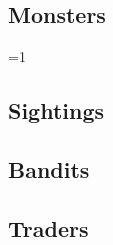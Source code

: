 \documentclass[a4paper,openany]{book}
\begin{document}
\begin{multicols}{2}

\ifcase\value{temperature}\relax%
\or
  \encColdVillages
  \encColdEdge
  \encColdForest
\or
  \encMildVillages
  \encMildEdge
  \encMildForest
\or
  \encWarmVillages
  \encWarmEdge
  \encWarmForest
\else
  \encMildVillages
  \encMildEdge
  \encMildForest
\fi

\subsection*{Monsters}

\setcounter{enc}{\value{temperature}}
\ifnum\value{temperature}=1
\fi

\begin{dlist}
\end{dlist}

\subsection*{Sightings}

\setcounter{track}{\value{temperature}}
\begin{dlist}
\end{dlist}

\subsection*{Bandits}

\encBandits

\subsection*{Traders}

\encTraders

\end{multicols}

\iftoggle{core}{
  \newpage
  \stackingDamageChart

  \begin{multicols}{2}

  \textbf{Mana Regeneration}

  \noindent
  \manaRegenChart

  \noindent
  \manaCoveringChart

  \larcenyChart
  \initiativechart

  \end{multicols}

  \chasechart
  \gatheringChart

}{}
\end{document}
